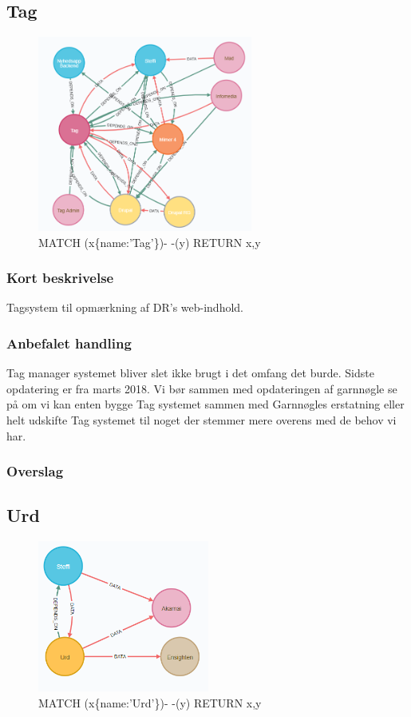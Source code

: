 \documentclass{article}
\begin{document}
\subsection{Tag}
\begin{figure}[h]
\includegraphics[width=200pt]{Tag.PNG}
\caption{MATCH (x\{name:'Tag'\})- -(y) RETURN x,y}
\end{figure}
\subsubsection{Kort beskrivelse}
Tagsystem til opmærkning af DR's web-indhold.
\subsubsection{Anbefalet handling}
Tag manager systemet bliver slet ikke brugt i det omfang det burde. Sidste opdatering er fra marts 2018. Vi bør sammen med opdateringen af garnnøgle se på om vi kan enten bygge Tag systemet sammen med Garnnøgles erstatning eller helt udskifte Tag systemet til noget der stemmer mere overens med de behov vi har.
\subsubsection{Overslag}


\subsection{Urd}
\begin{figure}[h]
\includegraphics[width=160pt]{Urd.PNG}
\caption{MATCH (x\{name:'Urd'\})- -(y) RETURN x,y}
\end{figure}
\end{document}
